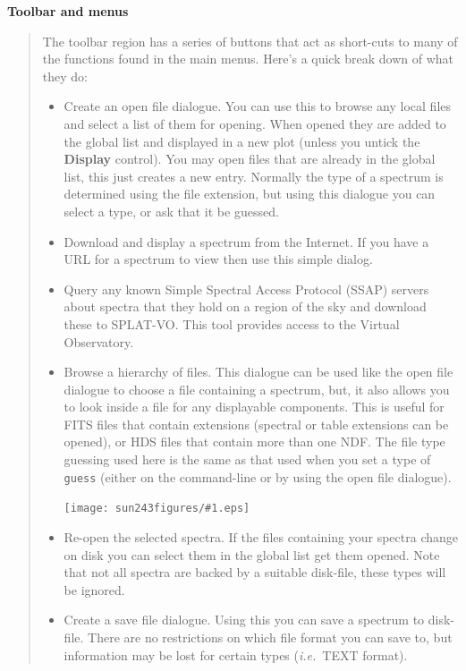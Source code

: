 \documentclass[twoside,11pt]{article}
\newcommand{\htmladdimg}[1]{}
\newcommand{\latexhtml}[2]{#1}
\renewcommand{\_}{\texttt{\symbol{95}}}
\newcommand{\SPLAT}{\textsf{SPLAT-VO}}
\newcommand{\clippedmainfigure}[1]
{\begin{center}
 \latexhtml{\texttt{[image: sun243\_figures/\#1.eps]}}{\htmladdimg{#1.gif}}
 \end{center}
}
\newcommand{\inline}[1]
        {\latexhtml{\texttt{[image: sun243\_figures/\#1.eps]}}
        {\htmladdimg[align=center]{#1.gif}}}
\newcommand{\labelitem}[1]{\textbf{#1}}
\newcommand{\hitext}[1]{\texttt{#1}}
\newcommand{\ie}{\textit{i.e.}}
\newcommand{\subheading}[1]{\textbf{\large{#1}}}
\begin{document}
\subheading{Toolbar and menus}
\begin{quote}
 The toolbar region has a series of buttons that act as short-cuts to
 many of the functions found in the main menus. Here's a quick break
 down of what they do:
 \begin{itemize}

  \item[\inline{openfile}] Create an open file dialogue. You can use this
  to browse any local files and select a list of them for opening. When
  opened they are added to the global list and displayed in a new plot
  (unless you untick the \labelitem{Display} control). You may open files
  that are already in the global list, this just creates a new entry.
  Normally the type of a spectrum is determined using the file extension,
  but using this dialogue you can select a type, or ask that it be guessed.

  \item[\inline{location}] Download and display a spectrum from the Internet.
  If you have a URL for a spectrum to view then use this simple dialog.

  \item[\inline{ssap}] Query any known Simple Spectral Access Protocol (SSAP)
  servers about spectra that they hold on a region of the sky and download
  these to \SPLAT. This tool provides access to the Virtual Observatory.

  \item[\inline{browse}] Browse a hierarchy of files. This dialogue can be used
  like the open file dialogue to choose a file containing a spectrum, but,
  it also allows you to look inside a file for any displayable components.
  This is useful for FITS files that contain extensions (spectral or table
  extensions can be opened), or HDS files that contain more than one NDF.
  The file type guessing used here is the same as that used when you set
  a type of \hitext{guess} (either on the command-line or by using the
  open file dialogue).

  \clippedmainfigure{treeview}

  \item[\inline{reopen}] Re-open the selected spectra. If the files containing
  your spectra change on disk you can select them in the global list get them
  opened. Note that not all spectra are backed by a suitable disk-file, these
  types will be ignored.

  \item[\inline{savefile}] Create a save file dialogue. Using this you can
  save a spectrum to disk-file. There are no restrictions on which file
  format you can save to, but information may be lost for certain types
  (\ie\ TEXT format).


\end{itemize}
\end{quote}
\end{document}
